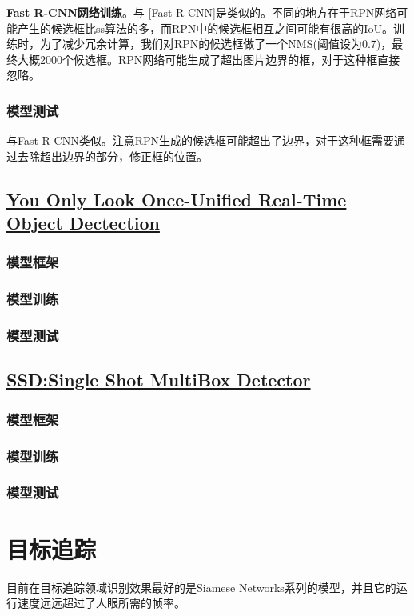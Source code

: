 \documentclass[]{article}
\begin{document}
\textbf{Fast R-CNN网络训练}。与 \ref{Fast R-CNN}是类似的。不同的地方在于RPN网络可能产生的候选框比ss算法的多，而RPN中的候选框相互之间可能有很高的IoU。训练时，为了减少冗余计算，我们对RPN的候选框做了一个NMS(阈值设为0.7)，最终大概2000个候选框。RPN网络可能生成了超出图片边界的框，对于这种框直接忽略。
\subsubsection{模型测试}
与Fast R-CNN类似。注意RPN生成的候选框可能超出了边界，对于这种框需要通过去除超出边界的部分，修正框的位置。
\subsection{\href{./papers/You Only Look Once-Unified Real-Time Object Dectection.pdf}{You Only Look Once-Unified Real-Time Object Dectection}}
\subsubsection{模型框架}
\subsubsection{模型训练}
\subsubsection{模型测试}
\subsection{\href{./papers/SSD Single Shot MultiBox Detector.pdf}{SSD:Single Shot MultiBox Detector}}
\subsubsection{模型框架}
\subsubsection{模型训练}
\subsubsection{模型测试}

\section{目标追踪}

目前在目标追踪领域识别效果最好的是Siamese Networks系列的模型，并且它的运行速度远远超过了人眼所需的帧率。
\end{document}
